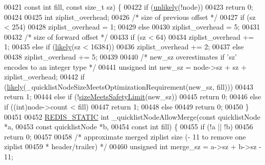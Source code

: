 \begin{DoxyCode}
{00421                                            \textcolor{keyword}{const} \textcolor{keywordtype}{int} fill, \textcolor{keyword}{const} size\_t sz) \{
00422     \textcolor{keywordflow}{if} (\hyperlink{quicklist_8c_ac6c45889010c1bd68631771b64f18101}{unlikely}(!node))
00423         \textcolor{keywordflow}{return} 0;
00424 
00425     \textcolor{keywordtype}{int} ziplist\_overhead;
00426     \textcolor{comment}{/* size of previous offset */}
00427     \textcolor{keywordflow}{if} (sz < 254)
00428         ziplist\_overhead = 1;
00429     \textcolor{keywordflow}{else}
00430         ziplist\_overhead = 5;
00431 
00432     \textcolor{comment}{/* size of forward offset */}
00433     \textcolor{keywordflow}{if} (sz < 64)
00434         ziplist\_overhead += 1;
00435     \textcolor{keywordflow}{else} \textcolor{keywordflow}{if} (\hyperlink{quicklist_8c_a217a0bd562b98ae8c2ffce44935351e1}{likely}(sz < 16384))
00436         ziplist\_overhead += 2;
00437     \textcolor{keywordflow}{else}
00438         ziplist\_overhead += 5;
00439 
00440     \textcolor{comment}{/* new\_sz overestimates if 'sz' encodes to an integer type */}
00441     \textcolor{keywordtype}{unsigned} \textcolor{keywordtype}{int} new\_sz = node->sz + sz + ziplist\_overhead;
00442     \textcolor{keywordflow}{if} (\hyperlink{quicklist_8c_a217a0bd562b98ae8c2ffce44935351e1}{likely}(\_quicklistNodeSizeMeetsOptimizationRequirement(new\_sz, fill)))
00443         \textcolor{keywordflow}{return} 1;
00444     \textcolor{keywordflow}{else} \textcolor{keywordflow}{if} (!\hyperlink{quicklist_8c_ab77edec9f8d4ebc2917da86841a5f202}{sizeMeetsSafetyLimit}(new\_sz))
00445         \textcolor{keywordflow}{return} 0;
00446     \textcolor{keywordflow}{else} \textcolor{keywordflow}{if} ((\textcolor{keywordtype}{int})node->count < fill)
00447         \textcolor{keywordflow}{return} 1;
00448     \textcolor{keywordflow}{else}
00449         \textcolor{keywordflow}{return} 0;
00450 \}
00451 
00452 \hyperlink{quicklist_8c_a9c22c9c899458021930a552a4f94d317}{REDIS\_STATIC} \textcolor{keywordtype}{int} \_quicklistNodeAllowMerge(\textcolor{keyword}{const} quicklistNode *a,
00453                                           \textcolor{keyword}{const} quicklistNode *b,
00454                                           \textcolor{keyword}{const} \textcolor{keywordtype}{int} fill) \{
00455     \textcolor{keywordflow}{if} (!a || !b)
00456         \textcolor{keywordflow}{return} 0;
00457 
00458     \textcolor{comment}{/* approximate merged ziplist size (- 11 to remove one ziplist}
00459 \textcolor{comment}{     * header/trailer) */}
00460     \textcolor{keywordtype}{unsigned} \textcolor{keywordtype}{int} merge\_sz = a->sz + b->sz - 11;
}
\end{DoxyCode}
